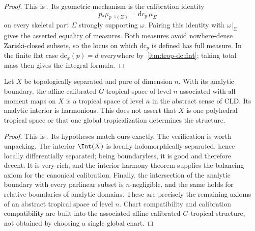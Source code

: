 \begin{proof}
This is \cite[Proposition~15.4.3]{CLD25}.  Its geometric mechanism is the
calibration identity
\[
 p_*\mu_{p^{-1}(\Sigma)}=\mathrm{dc}_p\,\mu_\Sigma
\]
on every skeletal part $\Sigma$ strongly supporting $\omega$.  Pairing this
identity with $\omega|_\Sigma$ gives the asserted equality of measures.  Both
measures avoid nowhere-dense Zariski-closed subsets, so the locus on which
$\mathrm{dc}_p$ is defined has full measure.  In the finite flat case
$\mathrm{dc}_x(p)=d$ everywhere by
\,\cref{itm:trop-dc:flat}; taking total mass
then gives the integral formula.
\end{proof}

\begin{theorem}\label{thm:analytic-is-tropical-space}
Let $X$ be topologically separated and pure of dimension $n$.  With its
analytic boundary, the affine calibrated $G$-tropical space of level $n$
associated with all moment maps on $X$ is a tropical space of level $n$ in
the abstract sense of CLD.  Its analytic interior is harmonious.  This does
not assert that $X$ is one polyhedral tropical space or that one global
tropicalization determines the structure.
\end{theorem}
\begin{proof}
This is \cite[Theorem~15.7.1]{CLD25}.  Its hypotheses match ours exactly.
The verification is worth unpacking.  The interior $\Int(X)$ is locally
holomorphically separated, hence locally differentially separated; being
boundaryless, it is good and therefore decent.  It is very rich, and the
interior-harmony theorem \cite[Theorem~15.6.1]{CLD25} supplies the balancing
axiom for the canonical calibration.  Finally, the intersection of the
analytic boundary with every parlinear subset is $n$-negligible, and the same
holds for relative boundaries of analytic domains.  These are precisely the
remaining axioms of an abstract tropical space of level $n$.  Chart
compatibility and calibration compatibility are built into the associated
affine calibrated $G$-tropical structure, not obtained by choosing a single
global chart.
\end{proof}

